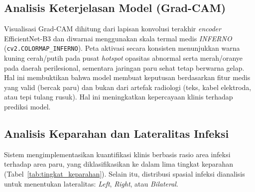 \documentclass[12pt,a4paper,twocolumn]{article}
\newcommand{\parencite}[1]{\citep{#1}}
\begin{document}
\subsection{Analisis Keterjelasan Model (Grad-CAM)}

Visualisasi Grad-CAM \parencite{selvaraju2017gradcam} dihitung dari lapisan
konvolusi terakhir \textit{encoder} EfficientNet-B3 dan diwarnai menggunakan skala termal medis \textit{INFERNO} (\texttt{cv2.COLORMAP\_INFERNO}). Peta aktivasi secara konsisten menunjukkan warna kuning cerah/putih pada pusat \textit{hotspot} opasitas abnormal serta merah/oranye pada daerah perilesional, sementara jaringan paru sehat tetap berwarna gelap. Hal ini membuktikan bahwa model membuat keputusan berdasarkan fitur medis yang valid (bercak paru) dan bukan dari artefak radiologi (teks, kabel elektroda, atau tepi tulang rusuk). Hal ini meningkatkan kepercayaan klinis terhadap prediksi model.

\subsection{Analisis Keparahan dan Lateralitas Infeksi}

Sistem mengimplementasikan kuantifikasi klinis berbasis rasio area infeksi
terhadap area paru, yang diklasifikasikan ke dalam lima tingkat keparahan
(Tabel~\ref{tab:tingkat_keparahan}). Selain itu, distribusi spasial infeksi
dianalisis untuk menentukan lateralitas: \textit{Left}, \textit{Right}, atau
\textit{Bilateral}.

\begin{table}[H]
  \centering
  \caption{Klasifikasi Tingkat Keparahan Infeksi Pneumonia.}
  \label{tab:tingkat_keparahan}
\end{table}
\end{document}
